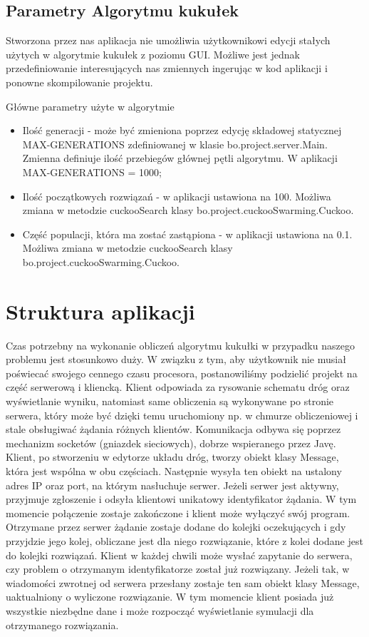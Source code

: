 \documentclass{article}
\begin{document}
\subsection {Parametry Algorytmu kukułek}

Stworzona przez nas aplikacja nie umożliwia użytkownikowi edycji stałych użytych w algorytmie kukułek z poziomu GUI. Możliwe jest jednak przedefiniowanie interesujących nas zmiennych ingerując w kod aplikacji i ponowne skompilowanie projektu. 

 {Główne parametry użyte w algorytmie}
\begin{itemize}
\item Ilość generacji - może być zmieniona poprzez edycję składowej statycznej MAX-GENERATIONS zdefiniowanej w klasie bo.project.server.Main. Zmienna definiuje ilość przebiegów głównej pętli algorytmu. W aplikacji  MAX-GENERATIONS = 1000;
\item Ilość początkowych rozwiązań - w aplikacji ustawiona na 100. Możliwa zmiana w metodzie cuckooSearch klasy bo.project.cuckooSwarming.Cuckoo.
\item Część populacji, która ma zostać zastąpiona - w aplikacji ustawiona na 0.1. Możliwa zmiana w metodzie cuckooSearch klasy bo.project.cuckooSwarming.Cuckoo.
\end{itemize}


\section{Struktura aplikacji}
Czas potrzebny na wykonanie obliczeń algorytmu kukułki w przypadku naszego problemu jest stosunkowo duży. W związku z tym, aby użytkownik nie musiał poświecać swojego cennego czasu procesora, postanowiliśmy podzielić projekt na część serwerową i kliencką. Klient odpowiada za rysowanie schematu dróg oraz wyświetlanie wyniku, natomiast same obliczenia są wykonywane po stronie serwera, który może być dzięki temu uruchomiony np. w chmurze obliczeniowej i stale obsługiwać żądania różnych klientów. 
Komunikacja odbywa się poprzez mechanizm socketów (gniazdek sieciowych), dobrze wspieranego przez Javę. Klient, po stworzeniu w edytorze układu dróg, tworzy obiekt klasy Message, która jest wspólna w obu częściach. Następnie wysyła ten obiekt na ustalony adres IP oraz port, na którym nasłuchuje serwer. Jeżeli serwer jest aktywny, przyjmuje zgłoszenie i odsyła klientowi unikatowy identyfikator żądania. W tym momencie połączenie zostaje zakończone i klient może wyłączyć swój program. 
Otrzymane przez serwer żądanie zostaje dodane do kolejki oczekujących i gdy przyjdzie jego kolej, obliczane jest dla niego rozwiązanie, które z kolei dodane jest do kolejki rozwiązań. Klient w każdej chwili może wysłać zapytanie do serwera, czy problem o otrzymanym identyfikatorze został już rozwiązany. Jeżeli tak, w wiadomości zwrotnej od serwera przesłany zostaje ten sam obiekt klasy Message, uaktualniony o wyliczone rozwiązanie. 
W tym momencie klient posiada już wszystkie niezbędne dane i może rozpocząć wyświetlanie symulacji dla otrzymanego rozwiązania. 
\end{document}
